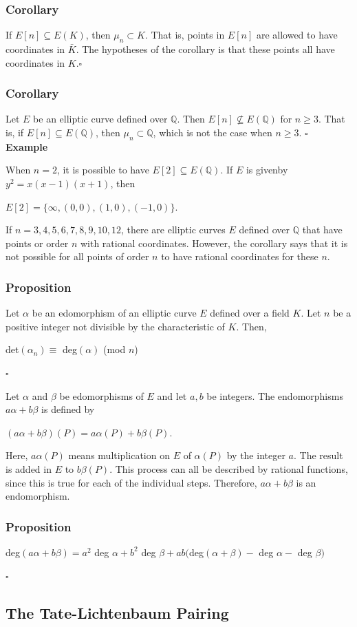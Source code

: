 \documentclass[a4paper, 12pt]{article}
\begin{document}
\subsubsection{Corollary}
If $E[n] \subseteq E(K)$, then $\mu_n \subset K$. \newline
That is, points in $E[n]$ are allowed to have coordinates in $\bar{K}$. The hypotheses of the corollary is that these points all have coordinates in $K$.$\square$
\subsubsection{Corollary}
Let $E$ be an elliptic curve defined over $\mathbb{Q}$. Then $E[n] \nsubseteq E(\mathbb{Q})$ for $n \geq 3$.\newline
That is, if $E[n] \subseteq E(\mathbb{Q})$, then $\mu_n \subset \mathbb{Q}$, which is not the case when $n \geq 3$. $\square$
\textbf{Example} \par
When $n=2$, it is possible to have $E[2] \subseteq E(\mathbb{Q})$. If $E$ is givenby $y^2=x(x-1)(x+1)$, then
\begin{center} $E[2] = \{\infty, (0,0),(1,0),(-1,0)\}$. \end{center}
If $n=3,4,5,6,7,8,9,10,12$, there are elliptic curves $E$ defined over $\mathbb{Q}$ that have points or order $n$ with rational coordinates. However, the corollary says that it is not possible for all points of order $n$ to have rational coordinates for these $n$.
\subsubsection{Proposition}
Let $\alpha$ be an edomorphism of an elliptic curve $E$ defined over a field $K$. Let $n$ be a positive integer not divisible by the characteristic of $K$. Then,
\begin{center} det$(\alpha_n) \equiv$ deg$(\alpha)$ (mod $n$) \end{center} $\square$\par
Let $\alpha$ and $\beta$ be edomorphisms of $E$ and let $a, b$ be integers. The endomorphisms $a\alpha + b\beta$ is defined by
\begin{center} $(a\alpha+b\beta)(P) = a\alpha(P)+b\beta(P).$ \end{center}
Here, $a\alpha(P)$ means multiplication on $E$ of $\alpha(P)$ by the integer $a$. The result is added in $E$ to $b\beta(P)$. This process can all be described by rational functions, since this is true for each of the individual steps. Therefore, $a\alpha+b\beta$ is an endomorphism.\par
\subsubsection{Proposition}
\begin{center}
deg$(a\alpha+b\beta) = a^2$ deg $\alpha + b^2$ deg $\beta + ab($deg$(\alpha+\beta) -$ deg $\alpha-$ deg $\beta)$
\end{center}
\par $\square$
\subsection {The Tate-Lichtenbaum Pairing}
\end{document}

